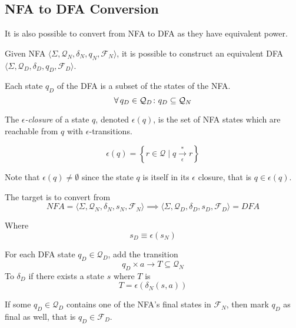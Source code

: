 \subsection{NFA to DFA Conversion}

It is also possible to convert from NFA to DFA as they have equivalent power.

\begin{definition}
    Given NFA $\langle \Sigma, \mathcal{Q}_N, \delta_N, q_N, \mathcal{F}_N \rangle$, it is possible to construct an equivalent DFA $\langle \Sigma, \mathcal{Q}_D, \delta_D, q_D, \mathcal{F}_D \rangle$.
    
    Each state $q_D$ of the DFA is a subset of the states of the NFA.
    \begin{equation}
        \operatorname{\forall} q_D \in \mathcal{Q}_D \colon q_D \subseteq \mathcal{Q}_N
    \end{equation}
\end{definition}

\begin{definition}
    The \textit{$\epsilon$-closure} of a state $q$, denoted $\epsilon(q)$, is the set of NFA states which are reachable from $q$ with $\epsilon$-transitions.
    
    \begin{equation}
        \epsilon(q) = \left\lbrace r \in \mathcal{Q} \mid q \xrightarrow[\epsilon]{\ast} r \right\rbrace
    \end{equation}
    
    Note that $\epsilon(q) \ne \emptyset$ since the state $q$ is itself in its $\epsilon$ closure, that is $q \in \epsilon(q)$.
\end{definition}

\begin{definition}
    The target is to convert from
    \begin{equation}
        NFA = \langle
            \Sigma,
            \mathcal{Q}_N,
            \delta_N,
            s_N,
            \mathcal{F}_N
        \rangle \implies
        \langle
            \Sigma,
            \mathcal{Q}_D,
            \delta_D,
            s_D,
            \mathcal{F}_D
        \rangle = DFA
    \end{equation}
    
    Where
    \begin{equation}
        s_D \equiv \epsilon(s_N)
    \end{equation}
    
    For each DFA state $q_D \in \mathcal{Q}_D$, add the transition
    \begin{equation}
        q_D \times a \to T \subseteq \mathcal{Q}_N
    \end{equation}
    To $\delta_D$ if there exists a state $s$ where $T$ is
    \begin{equation}
        T = \epsilon(\delta_N (s, a))
    \end{equation}
    
    If some $q_D \in \mathcal{Q}_D$ contains one of the NFA's final states in $\mathcal{F}_N$, then mark $q_D$ as final as well, that is $q_D \in \mathcal{F}_D$.
\end{definition}

